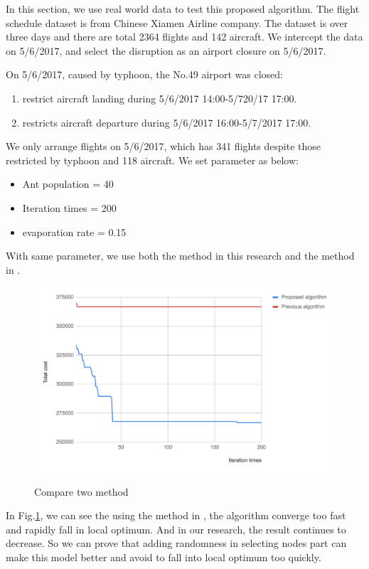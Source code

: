 \documentclass[senior]{IPSstyle}
\begin{document}
 In this section, we use real world data to test this proposed algorithm. The flight schedule dataset is from Chinese Xiamen Airline company. The dataset is over three days and there are total 2364 flights and 142 aircraft. We intercept the data on 5/6/2017, and select the disruption as an airport closure on 5/6/2017.
 
 On 5/6/2017, caused by typhoon, the  No.49 airport was closed:
 \begin{enumerate}
     \item restrict aircraft landing during 5/6/2017 14:00-5/720/17 17:00.
     \item restricts aircraft departure during 5/6/2017 16:00-5/7/2017 17:00. 
 \end{enumerate}
We only arrange flights on 5/6/2017, which has 341 flights despite those restricted by typhoon and 118 aircraft. We set parameter as below:
\begin{itemize}
    \item Ant population = 40
    \item Iteration times = 200
    \item evaporation rate = 0.15
\end{itemize}

With same parameter, we use both the method in this research and the method in \cite{sousa2015airline}. 
\begin{figure}[h]
    \centering
    \includegraphics[width = 15cm]{MasterThesis-master/compare-two-algorithm.png}\\
    \caption{Compare two method}
    \label{fig:compare with past}
\end{figure}
In Fig.\ref{fig:compare with past}, we can see the using the method in \cite{sousa2015airline}, the algorithm converge too fast and rapidly fall in local optimum. And in our research, the result continues to decrease. So we can prove that adding randomness in selecting nodes part can make this model better and avoid to fall into local optimum too quickly.
\end{document}
